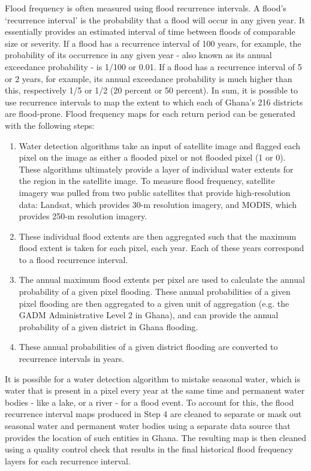 Flood frequency is often measured using flood recurrence intervals. A flood’s ‘recurrence interval’ is the probability that a flood will occur in any given year. It essentially provides an estimated interval of time between floods of comparable size or severity. If a flood has a recurrence interval of 100 years, for example, the probability of its occurrence in any given year - also known as its annual exceedance probability - is 1/100 or 0.01. If a flood has a recurrence interval of 5 or 2 years, for example, its annual exceedance probability is much higher than this, respectively 1/5 or 1/2 (20 percent or 50 percent). In sum, it is possible to use recurrence intervals to map the extent to which each of Ghana’s 216 districts are flood-prone. Flood frequency maps for each return period can be generated with the following steps:

\begin{enumerate}
  \item Water detection algorithms take an input of satellite image and flagged each pixel on the image as either a flooded pixel or not flooded pixel (1 or 0). These algorithms ultimately provide a layer of individual water extents for the region in the satellite image. To measure flood frequency, satellite imagery was pulled from two public satellites that provide high-resolution data: Landsat, which provides 30-m resolution imagery, and MODIS, which provides 250-m resolution imagery.

  \item These individual flood extents are then aggregated such that the maximum flood extent is taken for each pixel, each year. Each of these years correspond to a flood recurrence interval.
  
  \item The annual maximum flood extents per pixel are used to calculate the annual probability of a given pixel flooding. These annual probabilities of a given pixel flooding are then aggregated to a given unit of aggregation (e.g. the GADM Administrative Level 2 in Ghana), and can provide the annual probability of a given district in Ghana flooding.
  
  \item These annual probabilities of a given district flooding are converted to recurrence intervals in years.
\end{enumerate}

It is possible for a water detection algorithm to mistake seasonal water, which is water that is present in a pixel every year at the same time and permanent water bodies - like a lake, or a river - for a flood event. To account for this, the flood recurrence interval maps produced in Step 4 are cleaned to separate or mask out seasonal water and permanent water bodies using a separate data source that provides the location of such entities in Ghana.  The resulting map is then cleaned using a quality control check that results in the final historical flood frequency layers for each recurrence interval.

